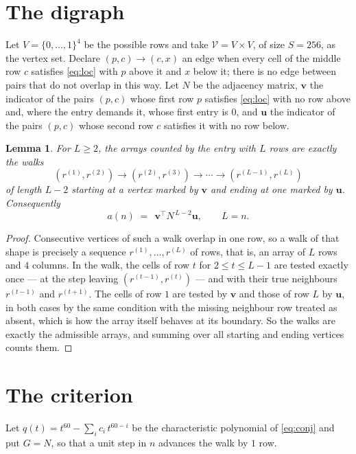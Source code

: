 \documentclass[11pt,a4paper]{article}
\theoremstyle{plain}
\newtheorem{lemma}[theorem]{Lemma}
\theoremstyle{definition}
\begin{document}
\section{The digraph}

Let $V=\{0,\dots,1\}^{4}$ be the possible rows and take
$\mathcal V=V\times V$, of size $S=256$, as the vertex set. Declare $(p,c)\to(c,x)$ an edge
when every cell of the middle row $c$ satisfies \eqref{eq:loc} with $p$ above it and $x$
below it; there is no edge between pairs that do not overlap in this way. Let $N$ be the
adjacency matrix, $\mathbf{v}$ the indicator of the pairs $(p,c)$ whose first row $p$
satisfies \eqref{eq:loc} with no row above and, where the entry demands it, whose first entry is $0$, and $\mathbf{u}$ the indicator of
the pairs $(p,c)$ whose second row $c$ satisfies it with no row below.

\begin{lemma}\label{lem:walk}
For $L\ge2$, the arrays counted by the entry with $L$ rows are exactly the walks
\[
(r^{(1)},r^{(2)})\to(r^{(2)},r^{(3)})\to\cdots\to(r^{(L-1)},r^{(L)})
\]
of length $L-2$ starting at a vertex marked by $\mathbf{v}$ and ending at one marked by
$\mathbf{u}$. Consequently
\[
a(n)\;=\;\,\mathbf{v}^{\!\top}N^{\,L-2}\mathbf{u},\qquad L=n .
\]
\end{lemma}

\begin{proof}
Consecutive vertices of such a walk overlap in one row, so a walk of that shape is
precisely a sequence $r^{(1)},\dots,r^{(L)}$ of rows, that is, an array of $L$ rows
and $4$ columns. In the walk, the cells of row $t$ for $2\le t\le L-1$ are tested
exactly once --- at the step leaving $(r^{(t-1)},r^{(t)})$ --- and with their true
neighbours $r^{(t-1)}$ and $r^{(t+1)}$. The cells of row $1$ are tested by
$\mathbf{v}$ and those of row $L$ by $\mathbf{u}$, in both cases by the same condition
with the missing neighbour row treated as absent, which is how the array itself behaves at
its boundary. So the walks are exactly the admissible arrays, and summing over all starting
and ending vertices counts them.
\end{proof}

\section{The criterion}

Let $q(t)=t^{60}-\sum_i c_i\,t^{60-i}$ be the characteristic polynomial of
\eqref{eq:conj} and put $G=N$, so that a unit step in $n$ advances the walk by
$1$ row.
\end{document}
